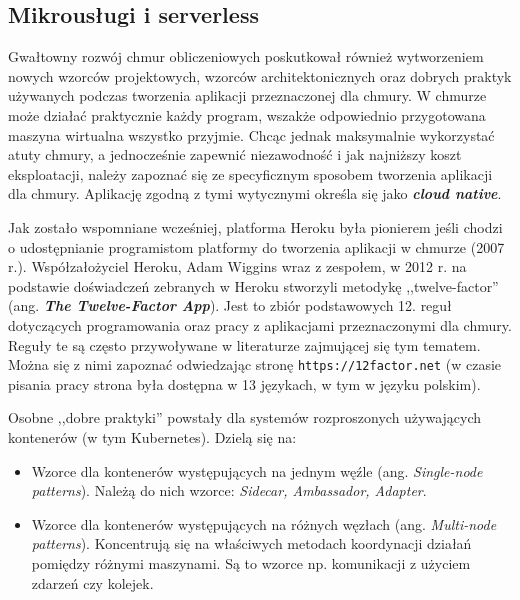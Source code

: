\documentclass[12pt,a4paper,twoside,titlepage,openright]{book}
\begin{document}
\subsection{Mikrousługi i serverless} \label{section:mikroserwisy}

Gwałtowny rozwój chmur obliczeniowych poskutkował również wytworzeniem nowych wzorców projektowych, wzorców architektonicznych oraz dobrych praktyk używanych podczas tworzenia aplikacji przeznaczonej dla chmury. W chmurze może działać praktycznie każdy program, wszakże odpowiednio przygotowana maszyna wirtualna wszystko przyjmie. Chcąc jednak maksymalnie wykorzystać atuty chmury, a jednocześnie zapewnić niezawodność i jak najniższy koszt eksploatacji, należy zapoznać się ze specyficznym sposobem tworzenia aplikacji dla chmury. Aplikację zgodną z tymi wytycznymi określa się jako \textbf{\textit{cloud native}}.

Jak zostało wspomniane wcześniej, platforma Heroku była pionierem jeśli chodzi o udostępnianie programistom platformy do tworzenia aplikacji w chmurze (2007 r.). Współzałożyciel Heroku, Adam Wiggins wraz z zespołem, w 2012 r. na podstawie doświadczeń zebranych w Heroku stworzyli metodykę ,,twelve-factor'' (ang. \textbf{\textit{The Twelve-Factor App}}). Jest to zbiór podstawowych 12. reguł dotyczących programowania oraz pracy z aplikacjami przeznaczonymi dla chmury. Reguły te są często przywoływane w literaturze zajmującej się tym tematem.\cite{cloudFoundry, microservicesPacktNetCore} Można się z nimi zapoznać odwiedzając stronę \texttt{https://12factor.net} (w czasie pisania pracy strona była dostępna w 13 językach, w tym w języku polskim).

Osobne ,,dobre praktyki'' powstały dla systemów rozproszonych używających kontenerów (w tym Kubernetes). Dzielą się na:
\begin{itemize}
\item Wzorce dla kontenerów występujących na jednym węźle (ang. \textit{Single-node patterns}). Należą do nich wzorce: \textit{Sidecar, Ambassador, Adapter}.
\item Wzorce dla kontenerów występujących na różnych węzłach (ang. \textit{Multi-node patterns}). Koncentrują się na właściwych metodach koordynacji działań pomiędzy różnymi maszynami. Są to wzorce np. komunikacji z użyciem zdarzeń czy kolejek.  \cite{kubernetesPacktMastering, distributedSystems}
\end{itemize}
\end{document}
